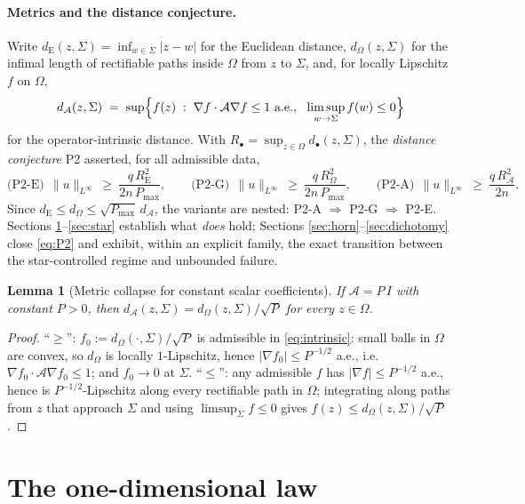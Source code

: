 \documentclass[10pt]{article}
\newtheorem{lemma}[theorem]{Lemma}
\theoremstyle{remark}
\newcommand{\A}{\mathcal{A}}
\newcommand{\Om}{\Omega}
\newcommand{\Sig}{\Sigma}
\newcommand{\Pmax}{P_{\max}}
\newcommand{\dE}{d_{\mathrm{E}}}
\newcommand{\dP}{d_{\Om}}
\newcommand{\dA}{d_{\A}}
\newcommand{\norminf}[1]{\|#1\|_{L^\infty}}
\begin{document}
\paragraph{Metrics and the distance conjecture.}
Write $\dE(z,\Sig)=\inf_{w\in\Sig}|z-w|$ for the Euclidean distance,
$\dP(z,\Sig)$ for the infimal length of rectifiable paths inside $\Om$ from $z$
to $\Sig$, and, for locally Lipschitz $f$ on $\Om$,
\begin{equation}\label{eq:intrinsic}
\dA(z,\Sig)\;=\;\sup\Bigl\{f(z)\;:\;\nabla f\cdot\A\nabla f\le 1\ \text{a.e.},
\ \ \limsup_{w\to\Sig} f(w)\le 0\Bigr\}
\end{equation}
for the operator-intrinsic distance. With
$R_\bullet=\sup_{z\in\Om}d_\bullet(z,\Sig)$, the \emph{distance conjecture} P2
asserted, for all admissible data,
\begin{equation}\label{eq:P2}
\text{(P2-E)}\ \ \norminf{u}\ \ge\ \frac{q\,R_{\mathrm E}^2}{2n\,\Pmax},\qquad
\text{(P2-G)}\ \ \norminf{u}\ \ge\ \frac{q\,R_{\Om}^2}{2n\,\Pmax},\qquad
\text{(P2-A)}\ \ \norminf{u}\ \ge\ \frac{q\,R_{\A}^2}{2n}.
\end{equation}
Since $\dE\le\dP\le\sqrt{\Pmax}\,\dA$, the variants are nested:
P2-A $\Rightarrow$ P2-G $\Rightarrow$ P2-E. Sections
\ref{sec:oned}--\ref{sec:star} establish what \emph{does} hold; Sections
\ref{sec:horn}--\ref{sec:dichotomy} close \eqref{eq:P2} and exhibit, within an
explicit family, the exact transition between the star-controlled regime and
unbounded failure.

\begin{lemma}[Metric collapse for constant scalar coefficients]\label{lem:metric}
If $\A=P\,I$ with constant $P>0$, then $\dA(z,\Sig)=\dP(z,\Sig)/\sqrt P$ for
every $z\in\Om$.
\end{lemma}

\begin{proof}
``$\ge$'': $f_0:=\dP(\cdot,\Sig)/\sqrt P$ is admissible in
\eqref{eq:intrinsic}: small balls in $\Om$ are convex, so $\dP$ is locally
$1$-Lipschitz, hence $|\nabla f_0|\le P^{-1/2}$ a.e., i.e.\
$\nabla f_0\cdot\A\nabla f_0\le 1$; and $f_0\to 0$ at $\Sig$.
``$\le$'': any admissible $f$ has $|\nabla f|\le P^{-1/2}$ a.e., hence is
$P^{-1/2}$-Lipschitz along every rectifiable path in $\Om$; integrating along
paths from $z$ that approach $\Sig$ and using $\limsup_{\Sig}f\le 0$ gives
$f(z)\le \dP(z,\Sig)/\sqrt P$.
\end{proof}

\section{The one-dimensional law}\label{sec:oned}
\end{document}
